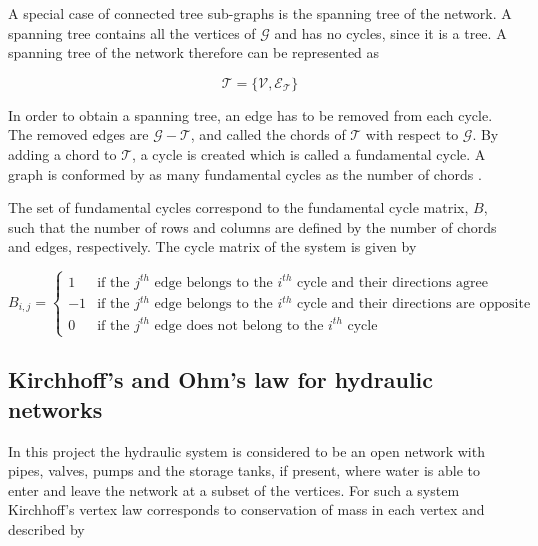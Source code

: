 A special case of connected tree sub-graphs is the spanning tree of the network. A spanning tree contains all the vertices of $\mathcal{G}$ and has no cycles, since it is a tree. A spanning tree of the network therefore can be represented as

\begin{equation}
  \label{Numberofchords}
  \mathcal{T} = \{\mathcal{V}, \mathcal{E_{\mathcal{T}}} \} 
\end{equation}

In order to obtain a spanning tree, an edge has to be removed from each cycle. The removed edges are $\mathcal{G} - \mathcal{T}$, and called the chords of $\mathcal{T}$ with respect to $\mathcal{G}$. By adding a chord to $\mathcal{T}$, a cycle is created which is called a fundamental cycle. A graph is conformed by as many fundamental cycles as the number of chords \cite{deo2017graph}.

The set of fundamental cycles correspond to the fundamental cycle matrix, $B$, such that the number of rows and columns are defined by the number of chords and edges, respectively. The cycle matrix of the system is given by

\begin{equation}
\label{DiGraphCycle}
 B_{i,j} =
		\left\{
		\begin{array}{ll}
		
		1 			&     \text{if the $j^{th}$ edge belongs to the $i^{th}$ cycle and their directions agree}	
\\
		-1          &     \text{if the $j^{th}$ edge belongs to the $i^{th}$ cycle and their directions are opposite}
\\
        0           &     \text{if the $j^{th}$ edge does not belong to the $i^{th}$ cycle}
		\end{array}
		\right.
\end{equation}	

\subsection{Kirchhoff's and Ohm's law for hydraulic networks}
\label{kirchhoffs_law}

In this project the hydraulic system is considered to be an open network with pipes, valves, pumps and the storage tanks, if present, where water is able to enter and leave the network at a subset of the vertices. For such a system Kirchhoff's vertex law corresponds to conservation of mass in each vertex and described by

